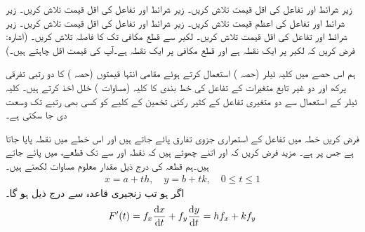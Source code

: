 زیر شرائط  اور   تفاعل   کی اقل قیمت تلاش کریں۔
زیر شرائط  اور   تفاعل   کی اقل قیمت تلاش کریں۔
زیر شرائط  اور   تفاعل   کی اعظم قیمت تلاش کریں۔
زیر شرائط  اور   تفاعل   کی اقل قیمت تلاش کریں۔
زیر شرائط  اور   تفاعل     کی اقل قیمت تلاش کریں۔
لکیر  سے قطع مکافی  تک کا  فاصلہ تلاش کریں۔ (اشارہ: فرض کریں  کہ لکیر پر  ایک نقطہ ہے اور  قطع مکافی  پر ایک نقطہ ہے۔آپ  کی قیمت  اقل  چاہتے ہیں۔)


ہم اس حصے  میں کلیہ ٹیلر  (حصہ )  استعمال کرتے ہوئے   مقامی انتہا  قیمتوں (حصہ )  کا دو رتبی تفرقی پرکھ اور دو غیر تابع  متغیرات کے تفاعل کی خط بندی   کا کلیہ  (مساوات )   خلل اخذ کرتے ہیں۔ کلیہ ٹیلر کے استعمال  سے  دو متغیری تفاعل کے کثیر رکنی تخمین کے کلیے کو   کسی بھی رتبے تک وسعت دی جا سکتی  ہے۔ 

فرض کریں  خطہ  میں  تفاعل   کے  استمراری جزوی تفارق  پائے جاتے ہیں اور اس خطے میں نقطہ   پایا جاتا ہے جس پر  ہے۔ مزید فرض کریں کہ  اور  اتنے  چھوٹے ہیں کہ نقطہ اور    سے  تک  قطعے،    میں پائے جاتے ہیں۔ہم قطعہ   کی درج ذیل  مقدار معلوم مساوات لکھتے ہیں۔
\begin{align*}
x=a+th,\quad y=b+tk,\quad 0\le t\le 1
\end{align*}
 اگر  ہو  تب زنجیری قاعدہ سے درج ذیل ہو گا۔
\begin{align*}
F'(t)=f_x\frac{\dif x}{\dif t}+f_y\frac{\dif y}{\dif t}=hf_x+kf_y
\end{align*}

